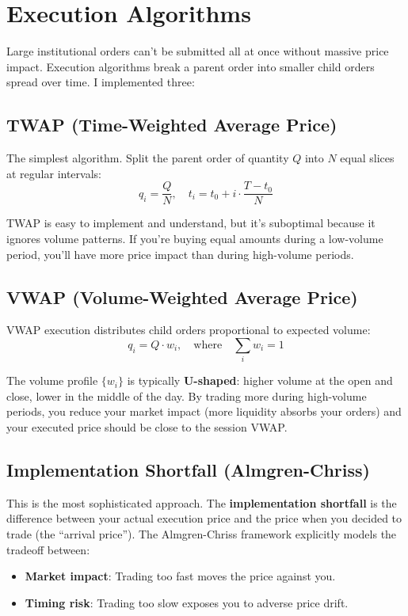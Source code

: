 \documentclass[11pt]{article}
\begin{document}
\section{Execution Algorithms}

Large institutional orders can't be submitted all at once without massive price impact. Execution algorithms break a parent order into smaller child orders spread over time. I implemented three:

\subsection{TWAP (Time-Weighted Average Price)}

The simplest algorithm. Split the parent order of quantity $Q$ into $N$ equal slices at regular intervals:
\[
    q_i = \frac{Q}{N}, \quad t_i = t_0 + i \cdot \frac{T - t_0}{N}
\]

TWAP is easy to implement and understand, but it's suboptimal because it ignores volume patterns. If you're buying equal amounts during a low-volume period, you'll have more price impact than during high-volume periods.

\subsection{VWAP (Volume-Weighted Average Price)}

VWAP execution distributes child orders proportional to expected volume:
\[
    q_i = Q \cdot w_i, \quad \text{where} \quad \sum_i w_i = 1
\]

The volume profile $\{w_i\}$ is typically \textbf{U-shaped}: higher volume at the open and close, lower in the middle of the day. By trading more during high-volume periods, you reduce your market impact (more liquidity absorbs your orders) and your executed price should be close to the session VWAP.

\subsection{Implementation Shortfall (Almgren-Chriss)}

This is the most sophisticated approach. The \textbf{implementation shortfall} is the difference between your actual execution price and the price when you decided to trade (the ``arrival price''). The Almgren-Chriss framework explicitly models the tradeoff between:

\begin{itemize}
    \item \textbf{Market impact}: Trading too fast moves the price against you.
    \item \textbf{Timing risk}: Trading too slow exposes you to adverse price drift.
\end{itemize}
\end{document}
